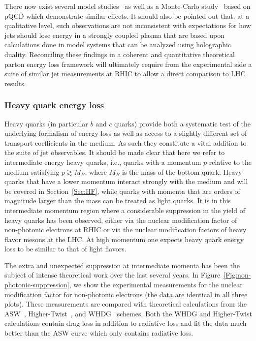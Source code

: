 There now exist several model studies~\cite{CasalderreySolana:2011rq,Qin:2010mn} as well as a Monte-Carlo study~\cite{Perez-Ramos:2014mna} based on pQCD which demonstrate similar effects. It should also be pointed out that, at a qualitative level, such observations are not inconsistent with expectations for how jets
should lose energy in a strongly coupled plasma that are based upon
calculations done in model systems that can be analyzed using holographic duality.
Reconciling these findings in a coherent and quantitative theoretical parton energy loss framework will ultimately require from the experimental side a suite of similar jet measurements at RHIC to allow a direct comparison to LHC results.
  
\subsubsection{Heavy quark energy loss}

Heavy quarks (in particular $b$ and $c$ quarks) provide both a systematic test of the underlying formalism of energy loss as well as access to a slightly different set of transport coefficients in the medium. As such they constitute a vital addition to the suite of jet observables. It should be made clear that here we refer to intermediate energy heavy quarks, i.e., quarks with a momentum $p$ relative to the medium satisfying $p \gtrsim M_{B}$, where $M_{B}$ is the mass of the bottom quark. 
Heavy quarks that have a lower momentum interact strongly  with the medium and will be covered in Section~\ref{Sec:HF}, while
quarks with momenta that are orders of magnitude larger than the mass can be treated as light quarks. It is in this intermediate momentum region where a considerable suppression in the yield of heavy quarks has been observed, either via the nuclear modification factor of non-photonic electrons at RHIC or via the nuclear modification factors of heavy flavor mesons at the LHC. At high momentum one expects heavy quark energy loss to be similar to that of light flavors. 


The extra and unexpected suppression at intermediate momenta has been the subject of intense theoretical work over the last several years. In Figure~\ref{Fig:non-photonic-suppression}, we show the 
experimental measurements for the nuclear modification factor for non-photonic electrons (the data are identical in all three plots). 
These measurements are compared with theoretical calculations from the ASW~\cite{Armesto:2003jh}, 
Higher-Twist~\cite{Qin:2009gw}, and WHDG~\cite{Wicks:2005gt} schemes. Both the WHDG and Higher-Twist calculations contain drag loss in addition to radiative loss and fit the data much better than the ASW curve which 
only contains radiative loss. 

